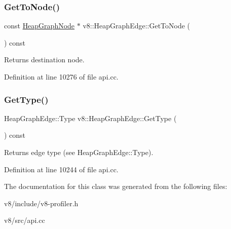\subsubsection{\texorpdfstring{Get\+To\+Node()}{GetToNode()}}
{\footnotesize\ttfamily const \mbox{\hyperlink{classv8_1_1HeapGraphNode}{Heap\+Graph\+Node}} $\ast$ v8\+::\+Heap\+Graph\+Edge\+::\+Get\+To\+Node (\begin{DoxyParamCaption}{ }\end{DoxyParamCaption}) const}

Returns destination node. 

Definition at line 10276 of file api.\+cc.

\mbox{\label{classv8_1_1HeapGraphEdge_a3d860b6d7cc571f2de369f8e9e9a6827}} 
\subsubsection{\texorpdfstring{Get\+Type()}{GetType()}}
{\footnotesize\ttfamily Heap\+Graph\+Edge\+::\+Type v8\+::\+Heap\+Graph\+Edge\+::\+Get\+Type (\begin{DoxyParamCaption}{ }\end{DoxyParamCaption}) const}

Returns edge type (see Heap\+Graph\+Edge\+::\+Type). 

Definition at line 10244 of file api.\+cc.



The documentation for this class was generated from the following files\+:\begin{DoxyCompactItemize}
\item 
v8/include/v8-\/profiler.\+h\item 
v8/src/api.\+cc\end{DoxyCompactItemize}
